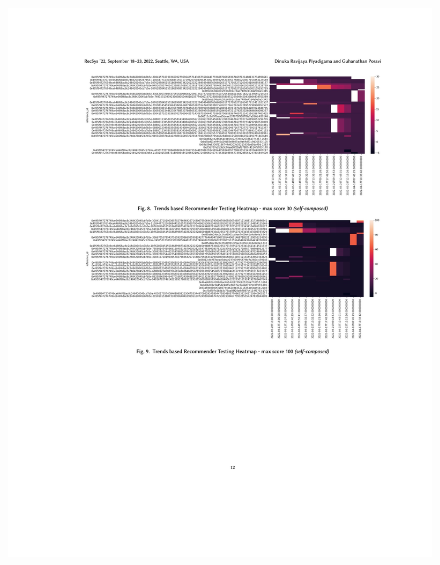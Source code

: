 \begin{figure}[h!]
\centering
\includegraphics[width=\textwidth]{images/appendix/papers/trends/Exploration of the possibility of infusing Social Media Trends into generating NFT Recommendations 12.jpeg}
\end{figure}

